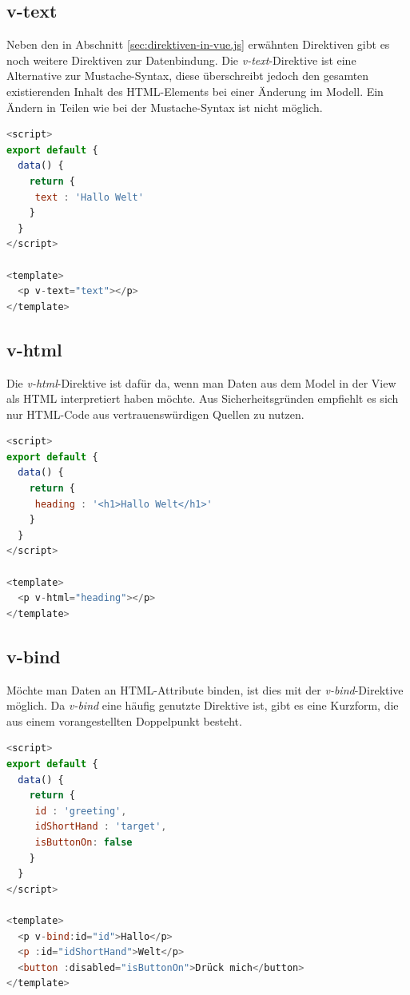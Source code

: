 \subsection*{v-text}
Neben den in Abschnitt \ref{sec:direktiven-in-vue.js}
erwähnten Direktiven gibt es noch weitere Direktiven zur Datenbindung.
Die \emph{v-text}-Direktive ist eine Alternative zur Mustache-Syntax,
diese überschreibt jedoch den gesamten existierenden Inhalt des HTML-Elements bei einer Änderung im Modell.
Ein Ändern in Teilen wie bei der Mustache-Syntax ist nicht möglich. \cite{vueDirectives}
\begin{lstlisting}[caption={\emph{v-text}-Direktive},language=javascript, label={lst:v-text-Direktive}]
<script>
export default {
  data() {
    return {
     text : 'Hallo Welt'
    }
  }
</script>

<template>
  <p v-text="text"></p>
</template>
\end{lstlisting}

\subsection*{v-html}
Die \emph{v-html}-Direktive ist dafür da, wenn man Daten aus dem Model in der View als HTML interpretiert haben möchte.
Aus Sicherheitsgründen empfiehlt es sich nur HTML-Code aus vertrauenswürdigen Quellen zu nutzen. \cite{vueTemplateSyntax}
\begin{lstlisting}[caption={\emph{v-html}-Direktive},language=javascript, label={lst:v-html-Direktive}]
<script>
export default {
  data() {
    return {
     heading : '<h1>Hallo Welt</h1>'
    }
  }
</script>

<template>
  <p v-html="heading"></p>
</template>
\end{lstlisting}

\subsection*{v-bind}
Möchte man Daten an HTML-Attribute binden, ist dies mit der \emph{v-bind}-Direktive möglich.
Da \emph{v-bind} eine häufig genutzte Direktive ist, gibt es eine Kurzform,
die aus einem vorangestellten Doppelpunkt besteht. \cite{vueTemplateSyntax}
\begin{lstlisting}[caption={\emph{v-bind}-Direktive},language=javascript, label={lst:v-bind-Direktive}]
<script>
export default {
  data() {
    return {
     id : 'greeting',
     idShortHand : 'target',
     isButtonOn: false
    }
  }
</script>

<template>
  <p v-bind:id="id">Hallo</p>
  <p :id="idShortHand">Welt</p>
  <button :disabled="isButtonOn">Drück mich</button>
</template>
\end{lstlisting}


